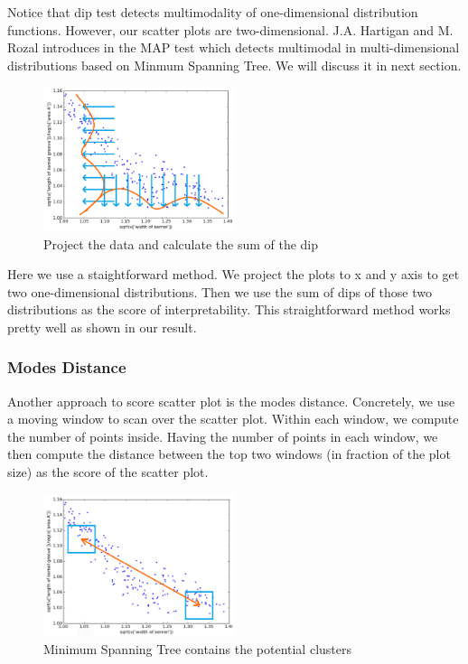 \documentclass[fleqn]{SelfArx} %
\begin{document}
Notice that dip test detects multimodality of one-dimensional distribution functions. However, our scatter plots are two-dimensional. J.A. Hartigan and M. Rozal introduces in \cite{MAP} the MAP test which detects multimodal in multi-dimensional distributions based on Minmum Spanning Tree. We will discuss it in next section. \\

\begin{figure}[h]
  \centering\includegraphics[width=0.5\textwidth]{HDT}
  \caption{Project the data and calculate the sum of the dip}
\end{figure}

Here we use a staightforward method. We project the plots to x and y axis to get two one-dimensional distributions. Then we use the sum of dips of those two distributions as the score of interpretability. This straightforward method works pretty well as shown in our result. 

\subsubsection{Modes Distance}
Another approach to score scatter plot is the modes distance. Concretely, we use a moving window to scan over the scatter plot. Within each window, we compute the number of points inside. Having the number of points in each window, we then compute the distance between the top two windows (in fraction of the plot
size) as the score of the scatter plot.\\

\begin{figure}[h]
  \centering\includegraphics[width=0.5\textwidth]{window}
  \caption{Minimum Spanning Tree contains the potential clusters}
\end{figure}
\end{document}
